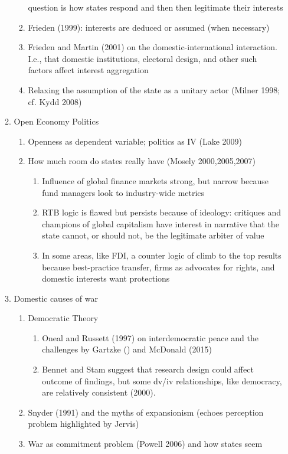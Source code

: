 \documentclass[11pt]{article}
\begin{document}
\begin{enumerate}
\begin{enumerate}
\begin{enumerate}
question is how states respond and then then legitimate their interests
\item Frieden (1999): interests are deduced or assumed (when necessary)
\item Frieden and Martin (2001) on the domestic-international
interaction. I.e., that domestic institutions, electoral
design, and other such factors affect interest aggregation
\item Relaxing the assumption of the state as a unitary actor
(Milner 1998; cf. Kydd 2008)
\end{enumerate}
\item Open Economy Politics
\begin{enumerate}
\item Openness as dependent variable; politics as IV (Lake 2009)
\item How much room do states really have (Mosely 2000,2005,2007)
\begin{enumerate}
\item Influence of global finance markets strong, but narrow
because fund managers look to industry-wide metrics
\item RTB logic is flawed but persists because of ideology:
critiques and champions of global capitalism have interest
in narrative that the state cannot, or should not, be the
legitimate arbiter of value
\item In some areas, like FDI, a counter logic of climb to the
top results because best-practice transfer, firms as
advocates for rights, and domestic interests want protections
\end{enumerate}
\end{enumerate}
\item Domestic causes of war
\begin{enumerate}
\item Democratic Theory
\begin{enumerate}
\item Oneal and Russett (1997) on interdemocratic peace and the
challenges by Gartzke () and McDonald (2015)
\item Bennet and Stam suggest that research design could affect
outcome of findings, but some dv/iv relationships, like
democracy, are relatively consistent (2000).
\end{enumerate}
\item Snyder (1991) and the myths of expansionism (echoes
perception problem highlighted by Jervis)
\item War as commitment problem (Powell 2006) and how states seem

\end{enumerate}
\end{enumerate}
\end{enumerate}
\end{document}
